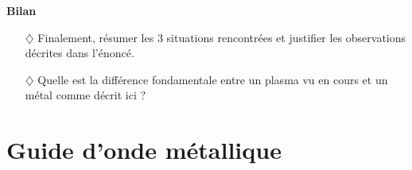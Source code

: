 \documentclass{report}
\begin{document}
\textbf{Bilan}

\begin{itemize}

	\item[$\diamondsuit$] Finalement, résumer les 3 situations rencontrées et justifier les observations décrites dans l'énoncé.

	\item[$\diamondsuit$] Quelle est la différence fondamentale entre un plasma vu en cours et un métal comme décrit ici ?

\end{itemize}

\section*{Guide d'onde métallique}
\end{document}
